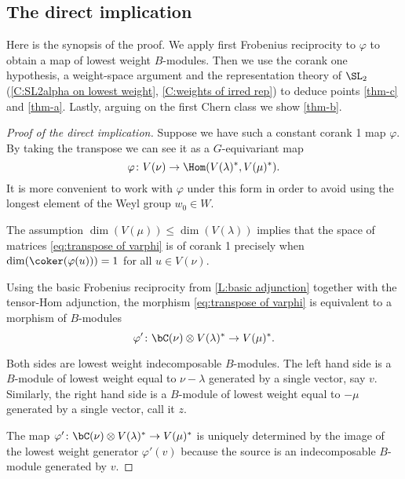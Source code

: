 \documentclass[reqno, 10pt]{amsart}
\theoremstyle{plain}
\theoremstyle{definition}
\numberwithin{equation}{section}%
\begin{document}
\subsection{The direct implication}\label{ss:direct implication}

Here is the synopsis of the proof. We apply first Frobenius reciprocity to $\varphi$ to obtain a map of lowest weight $B$-modules. Then we use the corank one hypothesis, a weight-space argument and the representation theory of $\SL_2$ (\cref{C:SL2alpha on lowest weight}, \cref{C:weights of irred rep}) to deduce points \ref{thm-c} and \ref{thm-a}. 
Lastly, arguing on the first Chern class we show \ref{thm-b}.

\begin{proof}[Proof of the direct implication]
	Suppose we have such a constant corank 1 map $\varphi$. By taking the transpose we can see it as a $G$-equivariant map
\begin{equation}\label{eq:transpose of varphi}
			\varphi\colon V(\nu)\to \Hom(V(\lambda)^*, V(\mu)^*).
\end{equation}
		It is more convenient to work with $\varphi$ under this form in order to avoid using the longest element of the Weyl group $w_0\in W$.
		
	The assumption $\dim(V(\mu))\le \dim(V(\lambda))$ implies that the space of matrices \eqref{eq:transpose of varphi} is of corank 1 precisely when $\dim(\coker(\varphi(u)))=1$ for all $u\in V(\nu)$. 
	
    Using the basic Frobenius reciprocity from \cref{L:basic adjunction} together with the tensor-Hom adjunction, the morphism \eqref{eq:transpose of varphi} is equivalent to a morphism of $B$-modules
	\begin{equation}\label{eq:phi' morph B mod}
		\varphi'\colon \bC(\nu)\otimes V(\lambda)^*\to V(\mu)^*.
	\end{equation}
	

      \medskip
      
	Both sides are lowest weight indecomposable $B$-modules. The left hand side is a $B$-module of lowest weight equal to $\nu-\lambda$ generated by a single vector, say $v$. 
	Similarly, the right hand side is a $B$-module of lowest weight equal to $-\mu$ generated by a single vector, call it $z$.
	
	The map $\varphi'\colon \bC(\nu)\otimes V(\lambda)^*\to V(\mu)^*$ is uniquely determined by the image of the lowest weight generator $\varphi'(v)$ because the source is an indecomposable $B$-module generated by $v$.
	

\end{proof}
\end{document}
